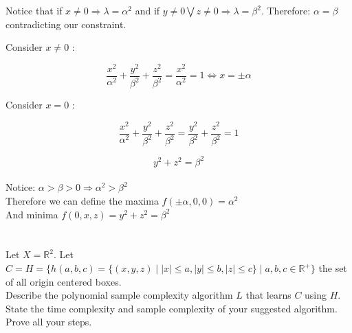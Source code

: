 \documentclass[12pt]{article}
\newcommand\tab[1][1cm]{\hspace*{#1}}
\begin{document}
Notice that if $ x \neq 0 \Rightarrow \lambda = \alpha^2$ and if $ y \neq 0 \bigvee  z \neq 0 \Rightarrow \lambda = \beta^2$. Therefore:  $\alpha = \beta$ contradicting our constraint.

Consider $x \neq 0$ :

$$ \frac{x^2}{\alpha^2} + \frac{y^2}{\beta^2} + \frac{z^2}{\beta^2} = \frac{x^2}{\alpha^2} = 1 \iff x = \pm \alpha$$

Consider $x = 0$ :

$$ \frac{x^2}{\alpha^2} + \frac{y^2}{\beta^2} + \frac{z^2}{\beta^2} = 
\frac{y^2}{\beta^2} + \frac{z^2}{\beta^2} = 1$$

$$ y^2 + z^2 = \beta^2 $$ \\ 

Notice: $\alpha > \beta > 0 \Rightarrow \alpha^2 > \beta^2$ \\

Therefore we can define the maxima $f(\pm \alpha,0,0) = \alpha^2 $\\

And minima $f(0,x,z) = y^2 + z^2 = \beta^2 $


\section*{}


\tab Let $X = \mathbb{R}^2$. Let $ C = H =  \lbrace h(a,b,c) = \lbrace(x,y,z) \mid |x| \leq a, |y| \leq b, |z| \leq c \rbrace \mid  a,b,c \in \mathbb{R}^+\rbrace $ the set of all origin centered boxes. \\
\tab Describe the polynomial sample complexity algorithm $L$ that learns $C$ using $H$. State the time complexity and sample complexity of your suggested algorithm. Prove all your steps.
\end{document}
